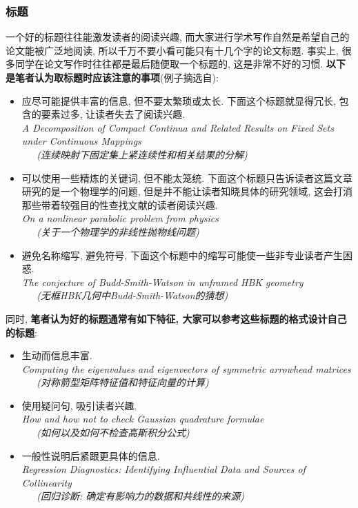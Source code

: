 \documentclass{booki}
\begin{document}
\subsubsection{标题}
一个好的标题往往能激发读者的阅读兴趣, 而大家进行学术写作自然是希望自己的论文能被广泛地阅读, 所以千万不要小看可能只有十几个字的论文标题. 事实上, 很多同学在论文写作时往往都是最后随便取一个标题的, 这是非常不好的习惯. \textbf{以下是笔者认为取标题时应该注意的事项}(例子摘选自\cite{JungelHow}):
\begin{itemize}
    \item 应尽可能提供丰富的信息, 但不要太繁琐或太长. 下面这个标题就显得冗长, 包含的要素过多, 让读者失去了阅读兴趣{.}\\
          \textit{A Decomposition of Compact Continua and Related Results on Fixed Sets under Continuous Mappings \\ \ \ \  (连续映射下固定集上紧连续性和相关结果的分解)}
    \item 可以使用一些精炼的关键词, 但不能太笼统. 下面这个标题只告诉读者这篇文章研究的是一个物理学的问题, 但是并不能让读者知晓具体的研究领域, 这会打消那些带着较强目的性查找文献的读者阅读兴趣{.}\\
          \textit{On a nonlinear parabolic problem from physics \\ \ \ \  (关于一个物理学的非线性抛物线问题)}
    \item 避免名称缩写, 避免符号, 下面这个标题中的缩写可能使一些非专业读者产生困惑{.}\\
          \textit{The conjecture of Budd-Smith-Watson in unframed HBK geometry  \\ \ \ \ (无框HBK几何中Budd-Smith-Watson的猜想)}
\end{itemize}
\par
同时, \textbf{笔者认为好的标题通常有如下特征, 大家可以参考这些标题的格式设计自己的标题}:
\begin{itemize}
    \item 生动而信息丰富{.}\\
          \textit{Computing the eigenvalues and eigenvectors of symmetric arrowhead matrices \\ \ \ \ (对称箭型矩阵特征值和特征向量的计算)}
    \item 使用疑问句, 吸引读者兴趣{.}\\
          \textit{How and how not to check Gaussian quadrature formulae \\ \ \ \ (如何以及如何不检查高斯积分公式)}
    \item 一般性说明后紧跟更具体的信息{.}\\
          \textit{Regression Diagnostics: Identifying Influential Data and Sources of Collinearity \\  \ \ \
              (回归诊断: 确定有影响力的数据和共线性的来源)}
\end{itemize}
\end{document}

